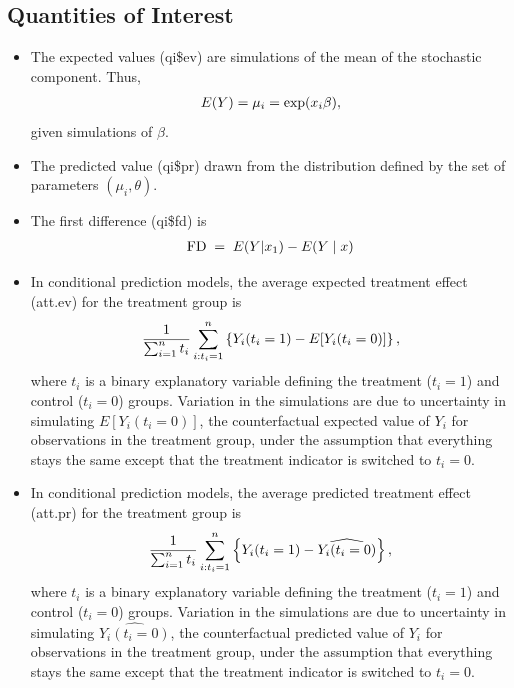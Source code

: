 \documentclass[letterpaper,10pt,english]{sphinxmanual}
\begin{document}
\subsection{Quantities of Interest}
\label{vignette:id28}\begin{itemize}
\item {} 
The expected values (qi\$ev) are simulations of the mean of the
stochastic component. Thus,
\begin{gather}
\begin{split}E(Y) = \mu_i = \exp(x_i
  \beta),\end{split}\notag
\end{gather}
given simulations of \(\beta\).

\item {} 
The predicted value (qi\$pr) drawn from the distribution defined by
the set of parameters \((\mu_i, \theta)\).

\item {} 
The first difference (qi\$fd) is
\begin{gather}
\begin{split}\textrm{FD} \; = \; E(Y | x_1) - E(Y \mid x)\end{split}\notag
\end{gather}
\item {} 
In conditional prediction models, the average expected treatment
effect (att.ev) for the treatment group is
\begin{gather}
\begin{split}\frac{1}{\sum_{i=1}^n t_i}\sum_{i:t_i=1}^n \left\{ Y_i(t_i=1) -
      E[Y_i(t_i=0)] \right\},\end{split}\notag
\end{gather}
where \(t_i\) is a binary explanatory variable defining the
treatment (\(t_i=1\)) and control (\(t_i=0\)) groups.
Variation in the simulations are due to uncertainty in simulating
\(E[Y_i(t_i=0)]\), the counterfactual expected value of
\(Y_i\) for observations in the treatment group, under the
assumption that everything stays the same except that the treatment
indicator is switched to \(t_i=0\).

\item {} 
In conditional prediction models, the average predicted treatment
effect (att.pr) for the treatment group is
\begin{gather}
\begin{split}\frac{1}{\sum_{i=1}^n t_i}\sum_{i:t_i=1}^n \left\{ Y_i(t_i=1) -
      \widehat{Y_i(t_i=0)} \right\},\end{split}\notag
\end{gather}
where \(t_i\) is a binary explanatory variable defining the
treatment (\(t_i=1\)) and control (\(t_i=0\)) groups.
Variation in the simulations are due to uncertainty in simulating
\(\widehat{Y_i(t_i=0)}\), the counterfactual predicted value of
\(Y_i\) for observations in the treatment group, under the
assumption that everything stays the same except that the treatment
indicator is switched to \(t_i=0\).

\end{itemize}
\end{document}
